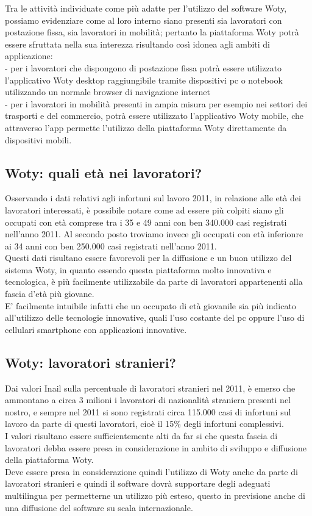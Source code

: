 Tra le attività individuate come più adatte per l'utilizzo del software Woty, possiamo evidenziare come al loro interno siano presenti sia lavoratori con postazione fissa, sia lavoratori in mobilità; pertanto la piattaforma Woty potrà essere sfruttata nella sua interezza risultando così idonea agli ambiti di applicazione:\\
- per i lavoratori che dispongono di postazione fissa potrà essere utilizzato l'applicativo Woty desktop raggiungibile tramite dispositivi pc o notebook utilizzando un normale browser di navigazione internet\\
- per i lavoratori in mobilità presenti in ampia misura per esempio nei settori dei trasporti e del commercio, potrà essere utilizzato l'applicativo Woty mobile, che attraverso l'app permette l'utilizzo della piattaforma Woty direttamente da dispositivi mobili.



\subsection{Woty: quali età nei lavoratori?}
Osservando i dati relativi agli infortuni sul lavoro 2011, in relazione alle età dei lavoratori interessati, è possibile notare come ad essere più colpiti siano gli occupati con età comprese tra i 35 e 49 anni con ben 340.000 casi registrati nell'anno 2011.
Al secondo posto troviamo invece gli occupati con età inferionre ai 34 anni con ben 250.000 casi registrati nell'anno 2011.\\
Questi dati risultano essere favorevoli per la diffusione e un buon utilizzo del sistema Woty, in quanto essendo questa piattaforma molto innovativa e tecnologica, è più facilmente utilizzabile da parte di lavoratori appartenenti alla fascia d'età più giovane.\\
E' facilmente intuibile infatti che un occupato di età giovanile sia più indicato all'utilizzo delle tecnologie innovative, quali l'uso costante del pc oppure l'uso di cellulari smartphone con applicazioni innovative.



\subsection{Woty: lavoratori stranieri?}
Dai valori Inail sulla percentuale di lavoratori stranieri nel 2011, è emerso che ammontano a circa 3 milioni i lavoratori di nazionalità straniera presenti nel nostro, e sempre nel 2011 si sono registrati circa 115.000 casi di infortuni sul lavoro da parte di questi lavoratori, cioè il 15\% degli infortuni complessivi.\\
I valori risultano essere sufficientemente alti da far si che questa fascia di lavoratori debba essere presa in considerazione in ambito di sviluppo e diffusione della piattaforma Woty.\\
Deve essere presa in considerazione quindi l'utilizzo di Woty anche da parte di lavoratori stranieri e quindi il software dovrà supportare degli adeguati multilingua per permetterne un utilizzo più esteso, questo in previsione anche di una diffusione del software su scala internazionale.



